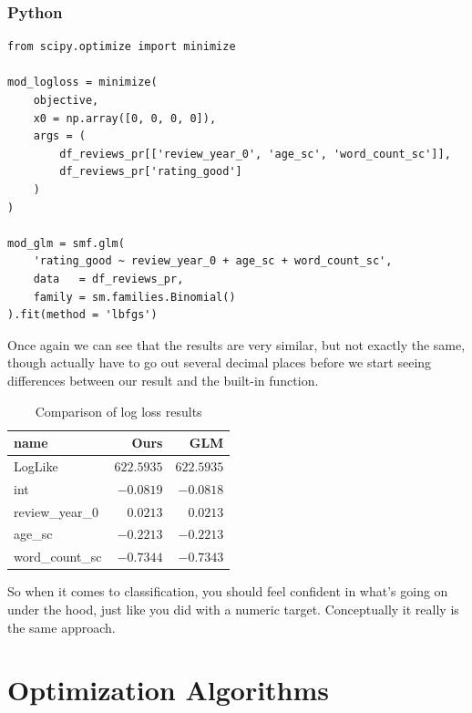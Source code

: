 \documentclass[
  letterpaper,
]{krantz}
\begin{document}
\subsubsection{Python}

\begin{verbatim}
from scipy.optimize import minimize

mod_logloss = minimize(
    objective,
    x0 = np.array([0, 0, 0, 0]),
    args = (
        df_reviews_pr[['review_year_0', 'age_sc', 'word_count_sc']], 
        df_reviews_pr['rating_good']
    )
)

mod_glm = smf.glm(
    'rating_good ~ review_year_0 + age_sc + word_count_sc',
    data   = df_reviews_pr,
    family = sm.families.Binomial()
).fit(method = 'lbfgs')
\end{verbatim}

Once again we can see that the results are very similar, but not exactly
the same, though actually have to go out several decimal places before
we start seeing differences between our result and the built-in
function.

\begin{longtable}{lrr}

\caption{\label{tbl-logloss}Comparison of log loss results}

\tabularnewline

\toprule
name & Ours & GLM \\ 
\midrule\addlinespace[2.5pt]
LogLike & \textcolor[HTML]{404040}{$622.5935$} & \textcolor[HTML]{404040}{$622.5935$} \\ 
int & \textcolor[HTML]{404040}{$-0.0819$} & \textcolor[HTML]{404040}{$-0.0818$} \\ 
review\_year\_0 & \textcolor[HTML]{404040}{$0.0213$} & \textcolor[HTML]{404040}{$0.0213$} \\ 
age\_sc & \textcolor[HTML]{404040}{$-0.2213$} & \textcolor[HTML]{404040}{$-0.2213$} \\ 
word\_count\_sc & \textcolor[HTML]{404040}{$-0.7344$} & \textcolor[HTML]{404040}{$-0.7343$} \\ 
\bottomrule

\end{longtable}

So when it comes to classification, you should feel confident in what's
going on under the hood, just like you did with a numeric target.
Conceptually it really is the same approach.

\section{Optimization Algorithms}\label{sec-estim-opt-algos}
\end{document}
